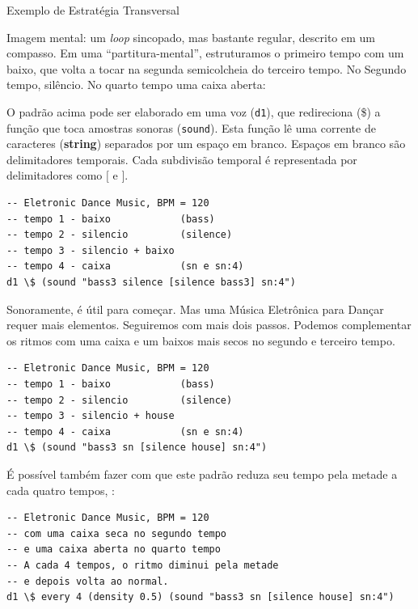 \begin{example}{Exemplo de Estratégia Transversal}\label{ex:tidal}

Imagem mental: um \emph{loop} sincopado, mas bastante regular, descrito em um compasso. Em uma ``partitura-mental'', estruturamos o primeiro tempo com um baixo, que volta a tocar na segunda semicolcheia do terceiro tempo. No Segundo tempo, silêncio. No quarto tempo uma caixa aberta:



O padrão acima pode ser elaborado em uma voz (\verb|d1|), que redireciona (\$) a função que toca amostras sonoras (\verb|sound|). Esta função lê uma corrente de caracteres (\textbf{string}) separados por um espaço em branco. Espaços em branco são delimitadores temporais. Cada subdivisão temporal é representada por delimitadores como $[$ e $]$. 

\begin{verbatim}
-- Eletronic Dance Music, BPM = 120 
-- tempo 1 - baixo            (bass)
-- tempo 2 - silencio         (silence)
-- tempo 3 - silencio + baixo
-- tempo 4 - caixa            (sn e sn:4)
d1 \$ (sound "bass3 silence [silence bass3] sn:4")
\end{verbatim}

Sonoramente, é útil para começar. Mas uma Música Eletrônica para Dançar requer mais elementos. Seguiremos com mais dois passos. Podemos complementar os ritmos com uma caixa e um baixos mais secos no segundo e terceiro tempo.



\begin{verbatim}
-- Eletronic Dance Music, BPM = 120 
-- tempo 1 - baixo            (bass)
-- tempo 2 - silencio         (silence)
-- tempo 3 - silencio + house
-- tempo 4 - caixa            (sn e sn:4)
d1 \$ (sound "bass3 sn [silence house] sn:4")
\end{verbatim}

É possível também fazer com que este padrão reduza seu tempo pela metade a cada quatro tempos, :



\begin{verbatim}
-- Eletronic Dance Music, BPM = 120
-- com uma caixa seca no segundo tempo
-- e uma caixa aberta no quarto tempo
-- A cada 4 tempos, o ritmo diminui pela metade 
-- e depois volta ao normal.
d1 \$ every 4 (density 0.5) (sound "bass3 sn [silence house] sn:4")
\end{verbatim}
\end{example}

